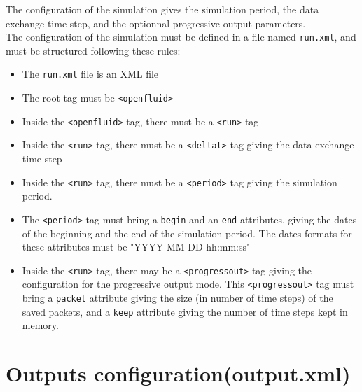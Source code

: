 The configuration of the simulation gives the simulation period, the data exchange time step, and the optionnal progressive output parameters.\\
\noindent The configuration of the simulation must be defined in a file named \texttt{run.xml},
and must be structured following these rules:
\begin{itemize}
  \item The \texttt{run.xml} file is an XML file
  \item The root tag must be \texttt{<openfluid>}
  \item Inside the \texttt{<openfluid>} tag, there must be a \texttt{<run>} tag
  \item Inside the \texttt{<run>} tag, there must be a \texttt{<deltat>} tag giving the data exchange time step 
  \item Inside the \texttt{<run>} tag, there must be a \texttt{<period>} tag giving the simulation period.
  \item The \texttt{<period>} tag must bring a \texttt{begin} and an \texttt{end} attributes, giving the dates of the beginning and the end of the simulation period.
  The dates formats for these attributes must be "YYYY-MM-DD hh:mm:ss"  
  \item Inside the \texttt{<run>} tag, there may be a \texttt{<progressout>} tag giving the configuration for the progressive output mode.
  This \texttt{<progressout>} tag must bring a \texttt{packet} attribute giving the size (in number of time steps) of the saved packets, and a \texttt{keep} attribute giving the number of time steps kept in memory.   
\end{itemize}


\bigskip

\section{Outputs configuration(output.xml)}

